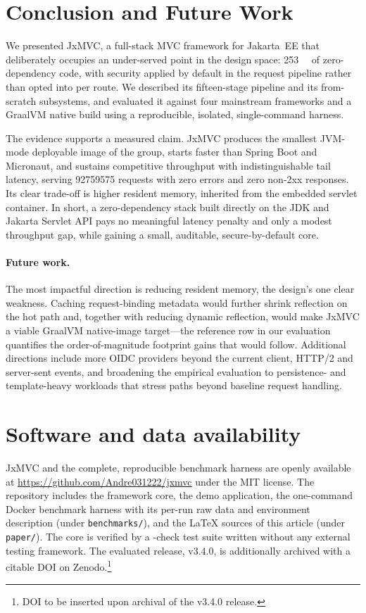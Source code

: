 \section{Conclusion and Future Work}\label{sec:conclusion}

We presented JxMVC, a full-stack MVC framework for Jakarta~EE that
deliberately occupies an under-served point in the design space:
\SI{253}{\kilo\byte} of zero-dependency code, with security applied by
default in the request pipeline rather than opted into per route. We
described its fifteen-stage pipeline and its from-scratch subsystems,
and evaluated it against four mainstream frameworks and a GraalVM
native build using a reproducible, isolated, single-command harness.

The evidence supports a measured claim. JxMVC produces the smallest
JVM-mode deployable image of the group, starts faster than Spring Boot
and Micronaut, and sustains competitive throughput with
indistinguishable tail latency, serving \num{92759575} requests with
zero errors and zero non-2xx responses. Its clear trade-off is higher
resident memory, inherited from the embedded servlet container. In
short, a zero-dependency stack built directly on the JDK and Jakarta
Servlet API pays no meaningful latency penalty and only a modest
throughput gap, while gaining a small, auditable, secure-by-default
core.

\paragraph{Future work.} The most impactful direction is reducing
resident memory, the design's one clear weakness. Caching request-binding
metadata would further shrink reflection on the hot path and, together
with reducing dynamic reflection, would make JxMVC a viable
GraalVM native-image target---the reference row in our evaluation
quantifies the order-of-magnitude footprint gains that would follow.
Additional directions include more OIDC providers beyond the current
client, HTTP/2 and server-sent events, and broadening the empirical
evaluation to persistence- and template-heavy workloads that stress
paths beyond baseline request handling.

\section{Software and data availability}\label{sec:availability}
JxMVC and the complete, reproducible benchmark harness are openly
available at \url{https://github.com/Andre031222/jxmvc} under the MIT
license. The repository includes the framework core, the demo
application, the one-command Docker benchmark harness with its per-run
raw data and environment description (under \texttt{benchmarks/}), and
the \LaTeX{} sources of this article (under \texttt{paper/}). The core
is verified by a \NTESTS-check test suite written without any external
testing framework. The evaluated release, v3.4.0, is additionally
archived with a citable DOI on Zenodo.\footnote{DOI to be inserted upon
archival of the v3.4.0 release.}

